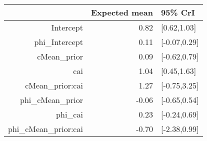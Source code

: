 \begin{tabular}{rrl}
  \hline
 & Expected mean & 95\% CrI \\ 
  \hline
Intercept & 0.82 & [0.62,1.03] \\ 
  phi\_Intercept & 0.11 & [-0.07,0.29] \\ 
  cMean\_prior & 0.09 & [-0.62,0.79] \\ 
  cai & 1.04 & [0.45,1.63] \\ 
  cMean\_prior:cai & 1.27 & [-0.75,3.25] \\ 
  phi\_cMean\_prior & -0.06 & [-0.65,0.54] \\ 
  phi\_cai & 0.23 & [-0.24,0.69] \\ 
  phi\_cMean\_prior:cai & -0.70 & [-2.38,0.99] \\ 
   \hline
\end{tabular}

